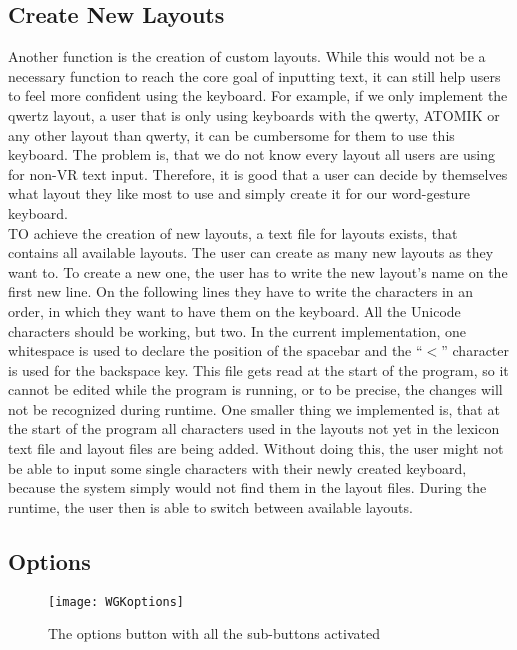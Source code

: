 \subsection{Create New Layouts}
Another function is the creation of custom layouts. While this would not be a necessary function to reach the core goal of inputting text, it can still help users to feel more confident using the keyboard. For example, if we only implement the qwertz layout, a user that is only using keyboards with the qwerty, ATOMIK or any other layout than qwerty, it can be cumbersome for them to use this keyboard. The problem is, that we do not know every layout all users are using for non-VR text input. Therefore, it is good that a user can decide by themselves what layout they like most to use and simply create it for our word-gesture keyboard.\\
TO achieve the creation of new layouts, a text file for layouts exists, that contains all available layouts. The user can create as many new layouts as they want to. To create a new one, the user has to write the new layout's name on the first new line. On the following lines they have to write the characters in an order, in which they want to have them on the keyboard. All the Unicode characters should be working, but two. In the current implementation, one whitespace is used to declare the position of the spacebar and the ``$<$'' character is used for the backspace key. This file gets read at the start of the program, so it cannot be edited while the program is running, or to be precise, the changes will not be recognized during runtime. One smaller thing we implemented is, that at the start of the program all characters used in the layouts not yet in the lexicon text file and layout files are being added. Without doing this, the user might not be able to input some single characters with their newly created keyboard, because the system simply would not find them in the layout files. During the runtime, the user then is able to switch between available layouts.

\subsection{Options}

\begin{figure}
    \centering
    \texttt{[image: WGKoptions]}
    \caption{The options button with all the sub-buttons activated}
    \label{fig:options}
\end{figure}

